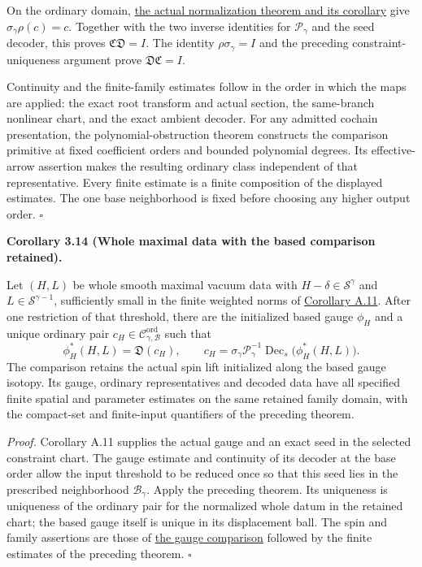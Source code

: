 \documentclass[
  english,
  11pt,
  reqno]{amsart}
\makeatletter
\newcommand{\pandocstatementheading}[1]{%
  \par\if@nobreak\else
    \addpenalty{\@beginparpenalty}%
    \addvspace{.5\baselineskip plus .2\baselineskip minus .2\baselineskip}%
  \fi
  {\normalfont\bfseries #1\par}%
  \nobreak\@afterindenttrue\@afterheading
}
\makeatother
\begin{document}
On the ordinary domain,
\hyperref[cor:online-effective-ordinary-class-identification]{the actual
normalization theorem and its corollary} give
\(\sigma_\gamma\rho(c)=c\). Together with the two inverse identities for
\(\mathscr P_\gamma\) and the seed decoder, this proves
\(\mathfrak C\mathfrak D=I\). The identity \(\rho\sigma_\gamma=I\) and
the preceding constraint-uniqueness argument prove
\(\mathfrak D\mathfrak C=I\).

Continuity and the finite-family estimates follow in the order in which
the maps are applied: the exact root transform and actual section, the
same-branch nonlinear chart, and the exact ambient decoder. For any
admitted cochain presentation, the polynomial-obstruction theorem
constructs the comparison primitive at fixed coefficient orders and
bounded polynomial degrees. Its effective-arrow assertion makes the
resulting ordinary class independent of that representative. Every
finite estimate is a finite composition of the displayed estimates. The
one base neighborhood is fixed before choosing any higher output order.
\hfill\(\square\)

\pandocstatementheading{\leavevmode{}\label{cor:online-ordinary-pair-ungauged-access}Corollary 3.14 (Whole maximal data with the based comparison retained).}

Let \((H,L)\) be whole smooth maximal vacuum data with
\(H-\delta\in\mathscr S^\gamma\) and \(L\in\mathscr S^{\gamma-1}\),
sufficiently small in the finite weighted norms of
\hyperref[cor:online-gauge-whole-data-decoding]{Corollary A.11}. After
one restriction of that threshold, there are the initialized based gauge
\(\phi_H\) and a unique ordinary pair
\(c_H\in\mathscr C^{\mathrm{ord}}_{\gamma,\mathcal B}\) such that%
 \[
\phi_H^*(H,L)=\mathfrak D(c_H),
\qquad
c_H=\sigma_\gamma\mathscr P_\gamma^{-1}
       \operatorname{Dec}_{s}\bigl(\phi_H^*(H,L)\bigr).
\] The comparison retains the actual spin lift initialized along the
based gauge isotopy. Its gauge, ordinary representatives and decoded
data have all specified finite spatial and parameter estimates on the
same retained family domain, with the compact-set and finite-input
quantifiers of the preceding theorem.

\emph{Proof.} Corollary A.11 supplies the actual gauge and an exact seed
in the selected constraint chart. The gauge estimate and continuity of
its decoder at the base order allow the input threshold to be reduced
once so that this seed lies in the prescribed neighborhood
\(\mathcal B_\gamma\). Apply the preceding theorem. Its uniqueness is
uniqueness of the ordinary pair for the normalized whole datum in the
retained chart; the based gauge itself is unique in its displacement
ball. The spin and family assertions are those of
\hyperref[prop:online-gauge-rotation-and-spin]{the gauge comparison}
followed by the finite estimates of the preceding theorem.
\hfill\(\square\)
\end{document}
